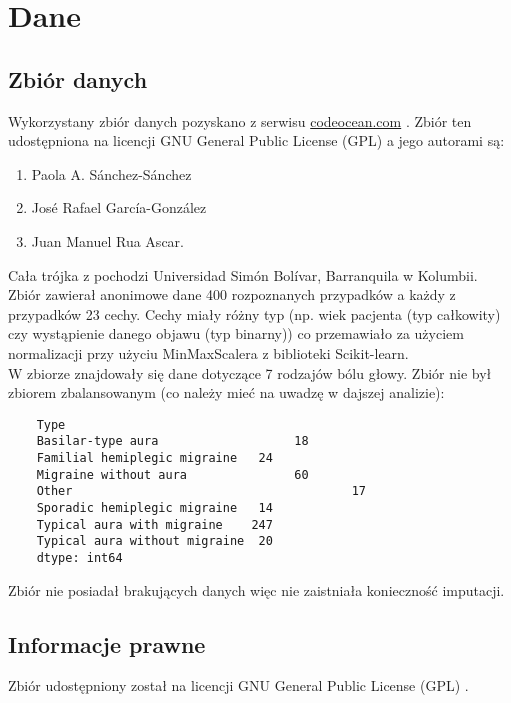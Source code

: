 \section{Dane}
\subsection{Zbiór danych}
Wykorzystany zbiór danych pozyskano z serwisu \url{codeocean.com} \cite{dane}. Zbiór ten udostępniona na licencji GNU General Public License (GPL) a jego autorami są: 

\begin{enumerate}
    \item Paola A. Sánchez-Sánchez
    \item José Rafael García-González
    \item Juan Manuel Rua Ascar. 
\end{enumerate}

\noindent
Cała trójka z pochodzi Universidad Simón Bolívar, Barranquila w Kolumbii.\\

\noindent
Zbiór zawierał anonimowe dane 400 rozpoznanych przypadków a każdy z przypadków 23 cechy. Cechy miały różny typ (np. wiek pacjenta (typ całkowity) czy wystąpienie danego objawu (typ binarny)) co przemawiało za użyciem normalizacji przy użyciu MinMaxScalera z biblioteki Scikit-learn.\\

\noindent
W zbiorze znajdowały się dane dotyczące 7 rodzajów bólu głowy.
Zbiór nie był zbiorem zbalansowanym (co należy mieć na uwadzę w dajszej analizie):

\begin{verbatim}
    Type
    Basilar-type aura 		            18
    Familial hemiplegic migraine   24
    Migraine without aura 		        60
    Other 				                        17
    Sporadic hemiplegic migraine   14
    Typical aura with migraine 	  247
    Typical aura without migraine  20
    dtype: int64
\end{verbatim}

\noindent
Zbiór nie posiadał brakujących danych więc nie zaistniała konieczność imputacji.

\subsection{Informacje prawne}
\noindent
Zbiór udostępniony został na licencji GNU General Public License (GPL) \cite{dane}.\\

